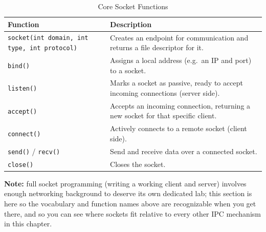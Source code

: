 \begin{table}[h!]
\centering
\small
\renewcommand{\arraystretch}{1.4}
\begin{tabular}{|p{5.5cm}|p{8.5cm}|}
\hline
\textbf{Function} & \textbf{Description} \\ \hline
\texttt{socket(int domain, int type, int protocol)} & Creates an endpoint for communication and returns a file descriptor for it. \\ \hline
\texttt{bind()} & Assigns a local address (e.g.\ an IP and port) to a socket. \\ \hline
\texttt{listen()} & Marks a socket as passive, ready to accept incoming connections (server side). \\ \hline
\texttt{accept()} & Accepts an incoming connection, returning a new socket for that specific client. \\ \hline
\texttt{connect()} & Actively connects to a remote socket (client side). \\ \hline
\texttt{send()} / \texttt{recv()} & Send and receive data over a connected socket. \\ \hline
\texttt{close()} & Closes the socket. \\ \hline
\end{tabular}
\caption{Core Socket Functions}
\end{table}

\textbf{Note:} full socket programming (writing a working client and server) involves enough networking background to deserve its own dedicated lab; this section is here so the vocabulary and function names above are recognizable when you get there, and so you can see where sockets fit relative to every other IPC mechanism in this chapter.




